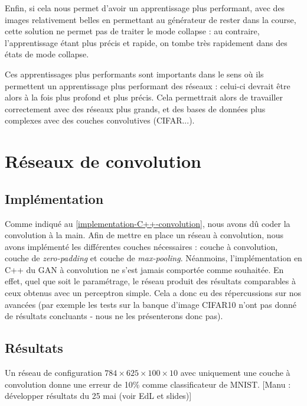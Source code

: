 Enfin, si cela nous permet d'avoir un apprentissage plus performant, avec des images relativement belles en permettant au générateur de rester dans la course, cette solution ne permet pas de traiter le mode collapse : au contraire, l'apprentissage étant plus précis et rapide, on tombe très rapidement dans des états de mode collapse.

Ces apprentissages plus performants sont importants dans le sens où ils permettent un apprentissage plus performant des réseaux : celui-ci devrait être alors à la fois plus profond et plus précis. Cela permettrait alors de travailler correctement avec des réseaux plus grands, et des bases de données plus complexes avec des couches convolutives (CIFAR...).

\section{Réseaux de convolution}
\label{DCGAN}
\subsection{Implémentation}
Comme indiqué au \ref{implementation-C++-convolution}, nous avons dû coder la convolution à la main.
Afin de mettre en place un réseau à convolution, nous avons implémenté les différentes couches nécessaires : couche à convolution, couche de \textit{zero-padding} et couche de \textit{max-pooling}.
Néanmoins, l'implémentation en C++ du GAN à convolution ne s'est jamais comportée comme souhaitée. En effet, quel que soit le paramétrage, le réseau produit des résultats comparables à ceux obtenus avec un perceptron simple. Cela a donc eu des répercussions sur nos avancées (par exemple les tests sur la banque d'image CIFAR10 n'ont pas donné de résultats concluants - nous ne les présenterons donc pas).

\subsection{Résultats}
Un réseau de configuration $784 \times 625 \times 100 \times 10$ avec uniquement une couche à convolution donne une erreur de 10\% comme classificateur de MNIST. [Manu : développer résultats du 25 mai (voir EdL et slides)]

